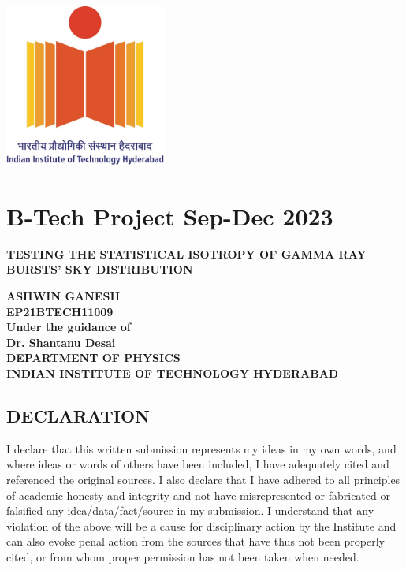 \documentclass[12pt]{article}
\author{}
\date{}
\begin{document}
\begin{center}
\includegraphics[width = 0.4\textwidth]{Picture 1.jpg}
\section{B-Tech Project Sep-Dec 2023}
\hfill \break
\hfill \break
\end{center}
\begin{center}
\large{\textbf{TESTING THE STATISTICAL ISOTROPY OF GAMMA RAY BURSTS' SKY DISTRIBUTION}}
\end{center}

\hfill \break
\begin{center}
\hfill \break
\hfill \break
\textbf{ASHWIN GANESH}
\\
\textbf{EP21BTECH11009}
\\
\hfill \break
\hfill \break
\textbf{Under the guidance of}
\\
\large{\textbf{Dr. Shantanu Desai}}
\\
\hfill \break
\hfill \break
\textbf{DEPARTMENT OF PHYSICS}
\\
\textbf{INDIAN INSTITUTE OF TECHNOLOGY HYDERABAD}
\end{center}
\clearpage


\hfill \break
\hfill \break
\hfill \break
\hfill \break
\hfill \break
\hfill \break
\hfill \break
\begin{center}
    \section{DECLARATION}
{\large I declare that this written submission represents my ideas in my own
words, and where ideas or words of others have been included, I have adequately
cited and referenced the original sources. I also declare that I have
adhered to all principles of academic honesty and integrity and not have
misrepresented or fabricated or falsified any idea/data/fact/source in
my submission. I understand that any violation of the above will be a
cause for disciplinary action by the Institute and can also evoke penal
action from the sources that have thus not been properly cited, or from
whom proper permission has not been taken when needed.}
\end{center}
\end{document}
